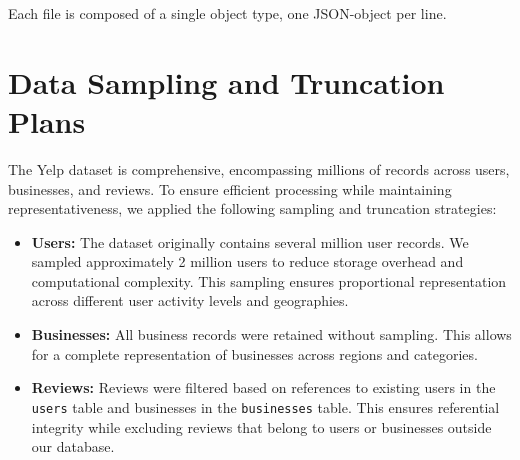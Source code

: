 Each file is composed of a single object type, one JSON-object per line.


\section{Data Sampling and Truncation Plans}

The Yelp dataset is comprehensive, encompassing millions of records across users, businesses, and reviews. To ensure efficient processing while maintaining representativeness, we applied the following sampling and truncation strategies:

\begin{itemize}
    \item \textbf{Users:} The dataset originally contains several million user records. We sampled approximately 2 million users to reduce storage overhead and computational complexity. This sampling ensures proportional representation across different user activity levels and geographies.
    \item \textbf{Businesses:} All business records were retained without sampling. This allows for a complete representation of businesses across regions and categories.
    \item \textbf{Reviews:} Reviews were filtered based on references to existing users in the \texttt{users} table and businesses in the \texttt{businesses} table. This ensures referential integrity while excluding reviews that belong to users or businesses outside our database.
\end{itemize}